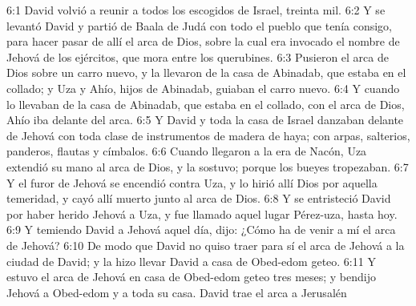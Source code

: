 6:1 David volvió a reunir a todos los escogidos de Israel, treinta mil.  
6:2 Y se levantó David y partió de Baala de Judá con todo el pueblo que tenía consigo, para hacer pasar de allí el arca de Dios, sobre la cual era invocado el nombre de Jehová de los ejércitos, que mora entre los querubines. 
6:3 Pusieron el arca de Dios sobre un carro nuevo, y la llevaron de la casa de Abinadab, que estaba en el collado; y Uza y Ahío, hijos de Abinadab, guiaban el carro nuevo.  
6:4 Y cuando lo llevaban de la casa de Abinadab, que estaba en el collado, con el arca de Dios, Ahío iba delante del arca.  
6:5 Y David y toda la casa de Israel danzaban delante de Jehová con toda clase de instrumentos de madera de haya; con arpas, salterios, panderos, flautas y címbalos.  
6:6 Cuando llegaron a la era de Nacón, Uza extendió su mano al arca de Dios, y la sostuvo; porque los bueyes tropezaban.  
6:7 Y el furor de Jehová se encendió contra Uza, y lo hirió allí Dios por aquella temeridad, y cayó allí muerto junto al arca de Dios.  
6:8 Y se entristeció David por haber herido Jehová a Uza, y fue llamado aquel lugar Pérez-uza, hasta hoy.  
6:9 Y temiendo David a Jehová aquel día, dijo: ¿Cómo ha de venir a mí el arca de Jehová?  
6:10 De modo que David no quiso traer para sí el arca de Jehová a la ciudad de David; y la hizo llevar David a casa de Obed-edom geteo.  
6:11 Y estuvo el arca de Jehová en casa de Obed-edom geteo tres meses; y bendijo Jehová a Obed-edom y a toda su casa. 
David trae el arca a Jerusalén  
 
